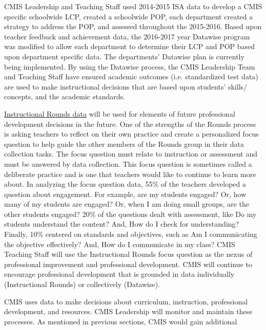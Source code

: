 \begin{findings}
CMIS Leadership and Teaching Staff used 2014-2015 ISA data to develop a CMIS specific schoolwide LCP, created a schoolwide POP, each department created a strategy to address the POP, and assessed throughout the 2015-2016. Based upon teacher feedback and achievement data, the 2016-2017 year Datawise program was modified to allow each department to determine their LCP and POP based upon department specific data. The departments’ Datawise plan is currently being implemented. By using the Datawise process, the CMIS Leadership Team and Teaching Staff have ensured academic outcomes (i.e. standardized test data) are used to make instructional decisions that are based upon students’ skills/ concepts, and the academic standards. 


\href{https://docs.google.com/a/cmis.ac.th/document/d/1cRvL50iIDvo8s1Gnxoczm82LhSVmEOvCrFksxzHD7ko/edit?usp=sharing}{Instructional Rounds data} will be used for elements of future professional development decisions in the future. One of the strengths of the Rounds process is asking teachers to reflect on their own practice and create a personalized focus question to help guide the other members of the Rounds group in their data collection tasks. The focus question must relate to instruction or assessment and must be answered by data collection. This focus question is sometimes called a deliberate practice and is one that teachers would like to continue to learn more about. In analyzing the focus question data,  55\% of the teachers developed a question about engagement. For example, are my students engaged? Or, how many of my students are engaged? Or, when I am doing small groups, are the other students engaged? 20\% of the questions dealt with assessment, like Do my students understand the content? And, How do I check for understanding? Finally, 10\% centered on standards and objectives, such as Am I communicating the objective effectively? And, How do I communicate in my class? CMIS Teaching Staff will use the Instructional Rounds focus question as the nexus of professional improvement and professional development. CMIS will continue to encourage professional development that is grounded in data individually (Instructional Rounds) or collectively (Datawise). 


CMIS uses data to make decisions about curriculum, instruction, professional development, and resources. CMIS Leadership will monitor and maintain these  processes. As mentioned in previous sections, CMIS would gain additional  
\end{findings}

